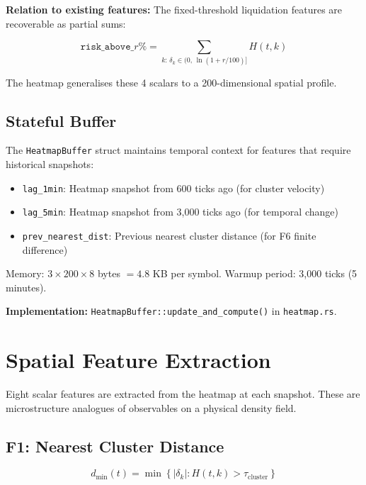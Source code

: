 \documentclass[11pt,a4paper]{article}
\begin{document}
\textbf{Relation to existing features:} The fixed-threshold liquidation features are recoverable as partial sums:

\begin{equation}
\texttt{risk\_above\_}r\% = \sum_{k:\, \delta_k \in (0,\, \ln(1+r/100)]} H(t,k)
\end{equation}

The heatmap generalises these 4 scalars to a 200-dimensional spatial profile.

\subsection{Stateful Buffer}

The \texttt{HeatmapBuffer} struct maintains temporal context for features that require historical snapshots:

\begin{itemize}
    \item \texttt{lag\_1min}: Heatmap snapshot from 600 ticks ago (for cluster velocity)
    \item \texttt{lag\_5min}: Heatmap snapshot from 3{,}000 ticks ago (for temporal change)
    \item \texttt{prev\_nearest\_dist}: Previous nearest cluster distance (for F6 finite difference)
\end{itemize}

Memory: $3 \times 200 \times 8$ bytes $= 4.8$ KB per symbol. Warmup period: 3{,}000 ticks (5 minutes).

\textbf{Implementation:} \texttt{HeatmapBuffer::update\_and\_compute()} in \texttt{heatmap.rs}.

\section{Spatial Feature Extraction}

Eight scalar features are extracted from the heatmap at each snapshot. These are microstructure analogues of observables on a physical density field.

\subsection{F1: Nearest Cluster Distance}

\begin{equation}
d_{\min}(t) = \min\left\{|\delta_k| : H(t,k) > \tau_{\text{cluster}}\right\}
\end{equation}
\end{document}
